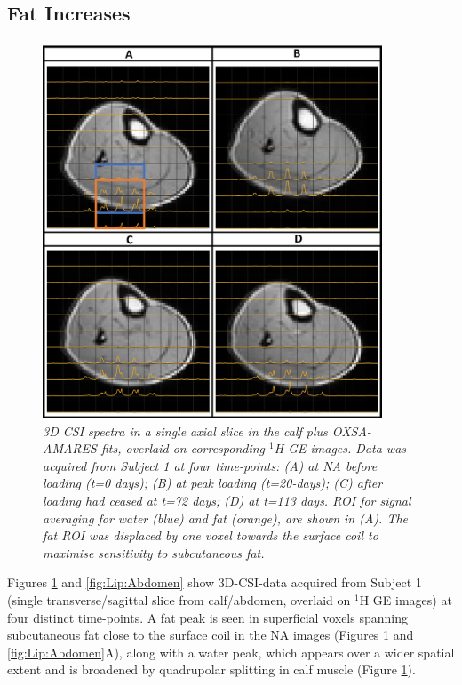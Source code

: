 \subsection{Fat Increases}

\begin{figure}
    \centering
    \includegraphics[width=0.9\textwidth]{Figures/Lipid/Calf.png}
    \caption{\textit{3D \ac{CSI} spectra in a single axial slice in the calf plus OXSA-AMARES fits, overlaid on corresponding $^1$H \ac{GE} images. Data was acquired from Subject 1 at four time-points: (A) at \ac{NA} before loading (t=0 days); (B) at peak loading (t=20-days); (C) after loading had ceased at t=72 days; (D) at t=113 days. ROI for signal averaging for water (blue) and fat (orange), are shown in (A). The fat \ac{ROI} was displaced by one voxel towards the surface coil to maximise sensitivity to subcutaneous fat.}}
    \label{fig:Lip:Calf}
\end{figure}

Figures \ref{fig:Lip:Calf} and \ref{fig:Lip:Abdomen} show 3D-\ac{CSI}-data acquired from Subject 1 (single transverse/sagittal slice from calf/abdomen, overlaid on $^1$H GE images) at four distinct time-points. A fat peak is seen in superficial voxels spanning subcutaneous fat close to the surface coil in the \ac{NA} images (Figures \ref{fig:Lip:Calf} and \ref{fig:Lip:Abdomen}A), along with a water peak, which appears over a wider spatial extent and is broadened by quadrupolar splitting in calf muscle (Figure \ref{fig:Lip:Calf}). 

